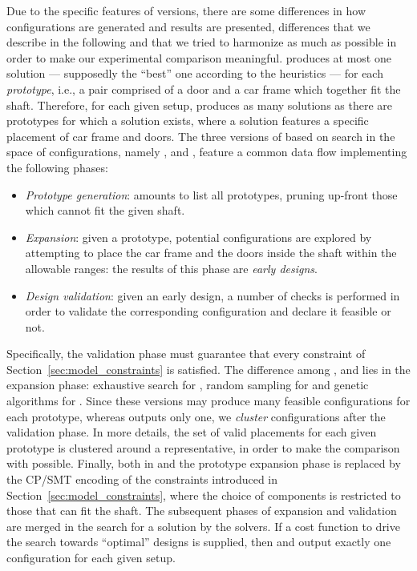 Due to the specific features of \liftcreate{} versions, there are some
differences in how configurations are generated and results are
presented, differences that we describe in the following and that we
tried to harmonize as much as possible in order to make our experimental
comparison meaningful. \liftcreatehr{} produces at most one solution --- 
supposedly the ``best'' one according to the heuristics --- for each 
\emph{prototype}, i.e., a pair comprised of a door and a car frame which 
together fit the shaft. Therefore, for each given setup, \liftcreatehr{} 
produces as many solutions as there are prototypes for which a
solution exists, where a solution features a specific placement 
of car frame and doors. The three versions of \liftcreate{} based on 
search in the space of configurations, namely \liftcreatebf{},
\liftcreaters{} and \liftcreatega{}, feature a common data flow
implementing the following phases:  
\begin{itemize}
	\item \emph{Prototype generation}: amounts to list all prototypes,
	pruning up-front those which cannot fit the given shaft.
	\item \emph{Expansion}: given a prototype, potential
	configurations are explored by attempting to place the car frame 
	and the doors inside the shaft within the allowable ranges:
	the results of this phase are  \emph{early designs}.
	\item \emph{Design validation}: given an early design, a number of 
	checks is performed in order to validate the corresponding 
	configuration and declare it feasible or not.
\end{itemize}
Specifically, the validation phase must guarantee that every constraint 
of Section~\ref{sec:model_constraints} is satisfied. The difference
among \liftcreatebf{}, \liftcreaters{} and \liftcreatega{} lies in the
expansion phase: exhaustive search for \liftcreatebf{}, random
sampling for \liftcreaters{} and genetic algorithms for
\liftcreatega{}. Since these versions may produce many feasible
configurations for each prototype, whereas \liftcreatehr{} outputs
only one, we \emph{cluster} configurations after the validation
phase. In more details, the set of valid placements for each given
prototype is clustered around a representative, in order to make the
comparison with \liftcreatehr{} possible. Finally, both in \liftcreatecp{}
and \liftcreatesmt{} the prototype expansion phase is replaced by the 
CP/SMT encoding of the constraints introduced in 
Section~\ref{sec:model_constraints}, where the choice of components is 
restricted to those that can fit the shaft. The subsequent phases of
expansion and validation are merged in the search for a solution by 
the solvers. If a cost function to drive the search towards ``optimal''
designs is supplied, then \liftcreatecp{} and \liftcreatesmt{} output 
exactly one configuration for each given setup.

